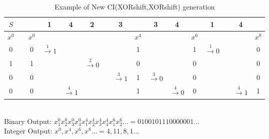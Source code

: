 \begin{table}[!t]
\begin{tabular}{|c|c@{}c|c@{}c@{}c@{}c@{}c@{}c|c@{}c@{}c|c@{}c@{}c@{}c|}
$S$  &  & &1 &4&2&        &3& &3&4&&1& &4 &  \\ \hline
$x^{0}$ &  &$x^{0}$ & & &  
&  & &$x^{4}$ & & &   
$x^{6}$& & &&$x^{8}$  \\
0 & &0 &$\xrightarrow{1} 1$ & &
 & &   &1   & & &
1 &$\xrightarrow{1} 0$ & & & 0\\
1 &  &1 &   &   &
$\xrightarrow{2} 0$ & & &0 & & &
0 & &  &&0\\
0 & &0 & & &
 & &$\xrightarrow{3} 1$ &1 &$\xrightarrow{3} 0$ & &
0 &   & & &0  \\
0 & &0  & &$\xrightarrow{4} 1$ &
 & & &1 & &$\xrightarrow{4} 0$ &
0 & & &$\xrightarrow{4} 1$&1 \\
\hline
\end{tabular}\\
\vspace{0.5cm}
Binary Output: $x_1^{0}x_2^{0}x_3^{0}x_4^{0}x_1^{4}x_2^{4}x_3^{4}x_4^{4}x_1^{6}x_2^{6}... = 0100101110000001...$\\
Integer Output:
$x^{0},x^{4},x^{6},x^{8}... = 4,11,8,1...$
\caption{Example of New CI(XORshift,XORshift) generation}
\label{table application example}
\end{table}







